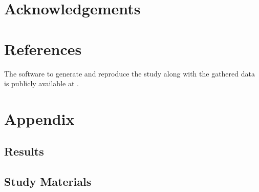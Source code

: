 \documentclass[11pt]{article}
\begin{document}
\section{Acknowledgements}


\section{References}

The software to generate and reproduce the study 
along with the gathered data is publicly available at \cite{Nair_Examining_Calibration_Large}.   





\appendix
\section{Appendix}



\subsection{Results}



\subsection{Study Materials}

\label{sec:appendix}
\end{document}
